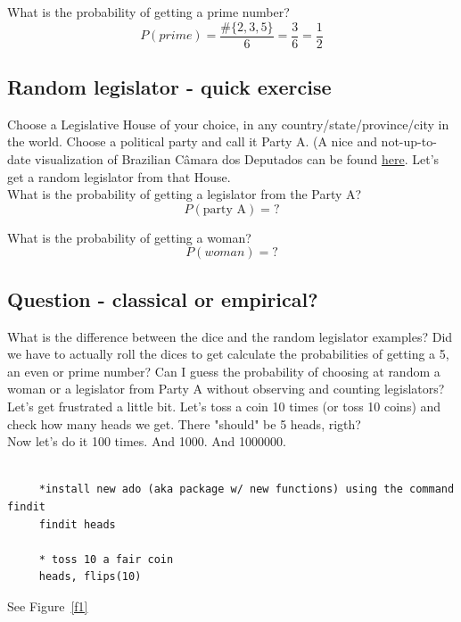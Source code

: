 \documentclass[11pt]{article}
\begin{document}
	What is the probability of getting a prime number?\\
	\[P(prime) = \frac{\#\{2, 3, 5\}}{6} = \frac{3}{6} = \frac{1}{2}	\]

	\subsection*{Random legislator - quick exercise}

	Choose a Legislative House of your choice, in any country/state/province/city in the world. Choose a political party and call it Party A. (A nice and not-up-to-date visualization of Brazilian Câmara dos Deputados can be found \href{http://g1.globo.com/politica/eleicoes/2014/nova-composicao-da-camara.html}{here}. Let's get a random legislator from that House.\\
	
	What is the probability of getting a legislator from the Party A?
	\[P(\text{party A}) = ?\]
	
	What is the probability of getting a woman?
	\[P(woman) = ?\]

	\subsection*{Question - classical or empirical?}

	What is the difference between the dice and the random legislator examples? Did we have to actually roll the dices to get calculate the probabilities of getting a 5, an even or prime number? Can I guess the probability of choosing at random a woman or a legislator from Party A without observing and counting legislators?\\

	Let's get frustrated a little bit. Let's toss a coin 10 times (or toss 10 coins) and check how many heads we get. There "should" be 5 heads, rigth?\\


	Now let's do it 100 times. And 1000. And 1000000.
	
	\begin{verbatim}

	 *install new ado (aka package w/ new functions) using the command findit
	 findit heads

	 * toss 10 a fair coin
	 heads, flips(10)
	\end{verbatim}

See Figure~\ref{f1}\\ 
\end{document}
